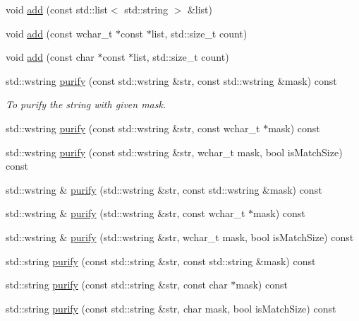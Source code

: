 \begin{DoxyCompactItemize}
void \hyperlink{classlakoo_1_1_text_purifier_ab5329c055bac1d28a85e16c90bab12d9}{add} (const std\+::list$<$ std\+::string $>$ \&list)
\item 
void \hyperlink{classlakoo_1_1_text_purifier_a18c9fc28060bb7e75dfcd88a277a2cbb}{add} (const wchar\+\_\+t $\ast$const $\ast$list, std\+::size\+\_\+t count)
\item 
void \hyperlink{classlakoo_1_1_text_purifier_a83426de858f38e94d5d48426cdc41149}{add} (const char $\ast$const $\ast$list, std\+::size\+\_\+t count)
\item 
std\+::wstring \hyperlink{classlakoo_1_1_text_purifier_ad4fc4eb008beecfeccafd7e1cf438df8}{purify} (const std\+::wstring \&str, const std\+::wstring \&mask) const
\begin{DoxyCompactList}\small\item\em To purify the string with given mask. \end{DoxyCompactList}\item 
std\+::wstring \hyperlink{classlakoo_1_1_text_purifier_aada61af13cc9f7c6a80b981dd200fc8a}{purify} (const std\+::wstring \&str, const wchar\+\_\+t $\ast$mask) const
\item 
std\+::wstring \hyperlink{classlakoo_1_1_text_purifier_a7976290c72112aa08b0c274df267ab80}{purify} (const std\+::wstring \&str, wchar\+\_\+t mask, bool is\+Match\+Size) const
\item 
std\+::wstring \& \hyperlink{classlakoo_1_1_text_purifier_a03abdabf613ea26d01a1643297660a82}{purify} (std\+::wstring \&str, const std\+::wstring \&mask) const
\item 
std\+::wstring \& \hyperlink{classlakoo_1_1_text_purifier_a24a12d550199c8402081eed59a5deab7}{purify} (std\+::wstring \&str, const wchar\+\_\+t $\ast$mask) const
\item 
std\+::wstring \& \hyperlink{classlakoo_1_1_text_purifier_a8d1dab81e72c89cab2c991eab08dcffe}{purify} (std\+::wstring \&str, wchar\+\_\+t mask, bool is\+Match\+Size) const
\item 
std\+::string \hyperlink{classlakoo_1_1_text_purifier_a9c8a9f7009fa673e49999a9575eac0cf}{purify} (const std\+::string \&str, const std\+::string \&mask) const
\item 
std\+::string \hyperlink{classlakoo_1_1_text_purifier_a40382e6a751509a4c3737044fd06c93e}{purify} (const std\+::string \&str, const char $\ast$mask) const
\item 
std\+::string \hyperlink{classlakoo_1_1_text_purifier_a5e47d8d8bce3c6d3c34d13d43009e100}{purify} (const std\+::string \&str, char mask, bool is\+Match\+Size) const

\end{DoxyCompactItemize}
